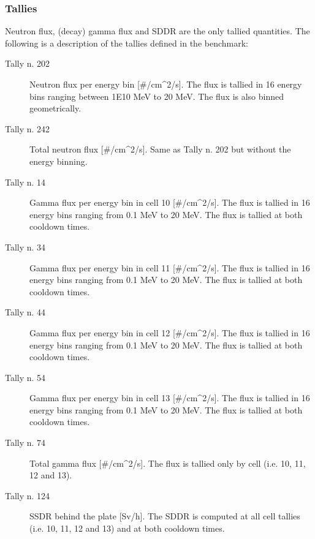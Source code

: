 \documentclass[letterpaper,10pt,english]{sphinxmanual}
\begin{document}
\subsubsection{Tallies}
\label{\detokenize{usage/benchmarks:id11}}
\sphinxAtStartPar
Neutron flux, (decay) gamma flux and SDDR are the only tallied quantities. The following
is a description of the tallies defined in the benchmark:
\begin{description}
\item[{Tally n. 202}] \leavevmode
\sphinxAtStartPar
Neutron flux per energy bin {[}\#/cm\textasciicircum{}2/s{]}. The flux is tallied in 16 energy bins ranging between 1E\sphinxhyphen{}10 MeV to 20 MeV. The flux is also binned geometrically.

\item[{Tally n. 242}] \leavevmode
\sphinxAtStartPar
Total neutron flux {[}\#/cm\textasciicircum{}2/s{]}. Same as Tally n. 202 but without the energy binning.

\item[{Tally n. 14}] \leavevmode
\sphinxAtStartPar
Gamma flux per energy bin in cell 10 {[}\#/cm\textasciicircum{}2/s{]}. The flux is tallied in 16 energy bins ranging from 0.1 MeV to 20 MeV. The flux is tallied at both cool\sphinxhyphen{}down times.

\item[{Tally n. 34}] \leavevmode
\sphinxAtStartPar
Gamma flux per energy bin in cell 11 {[}\#/cm\textasciicircum{}2/s{]}. The flux is tallied in 16 energy bins ranging from 0.1 MeV to 20 MeV. The flux is tallied at both cool\sphinxhyphen{}down times.

\item[{Tally n. 44}] \leavevmode
\sphinxAtStartPar
Gamma flux per energy bin in cell 12 {[}\#/cm\textasciicircum{}2/s{]}. The flux is tallied in 16 energy bins ranging from 0.1 MeV to 20 MeV. The flux is tallied at both cool\sphinxhyphen{}down times.

\item[{Tally n. 54}] \leavevmode
\sphinxAtStartPar
Gamma flux per energy bin in cell 13 {[}\#/cm\textasciicircum{}2/s{]}. The flux is tallied in 16 energy bins ranging from 0.1 MeV to 20 MeV. The flux is tallied at both cool\sphinxhyphen{}down times.

\item[{Tally n. 74}] \leavevmode
\sphinxAtStartPar
Total gamma flux {[}\#/cm\textasciicircum{}2/s{]}. The flux is tallied only by cell (i.e. 10, 11, 12 and 13).

\item[{Tally n. 124}] \leavevmode
\sphinxAtStartPar
SSDR behind the plate {[}Sv/h{]}. The SDDR is computed at all cell tallies (i.e. 10, 11, 12 and 13) and at both cool\sphinxhyphen{}down times.

\end{description}
\end{document}
